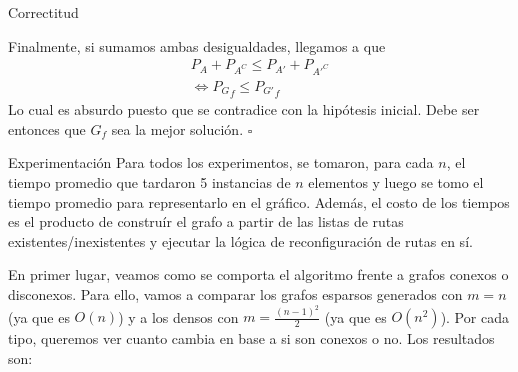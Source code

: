 \documentclass[a4paper]{article}
\begin{document}
\begin{subsection}{Correctitud}
\begin{itemize}
\begin{enumerate}[(a)]
    \end{enumerate}
\end{itemize}
Finalmente, si sumamos ambas desigualdades, llegamos a que 
\begin{align*}
	P_A + P_{A^C} \leq P_{A'} + P_{{A'}^C} \\ 
    \Leftrightarrow {P_G}_f \leq {P_{G'}}_f
\end{align*}
Lo cual es absurdo puesto que se contradice con la hip\'{o}tesis inicial. Debe ser entonces que $G_f$ sea la mejor soluci\'{o}n. $\square$

\end{subsection}

\begin{subsection}{Experimentaci\'{o}n}
Para todos los experimentos, se tomaron, para cada $n$, el tiempo promedio que tardaron 5 instancias de $n$ elementos y luego se tomo el tiempo promedio para representarlo en el gr\'{a}fico. Adem\'{a}s, el costo de los tiempos es el producto de constru\'{i}r el grafo a partir de las listas de rutas existentes/inexistentes y ejecutar la l\'{o}gica de reconfiguraci\'{o}n de rutas en s\'{i}.


En primer lugar, veamos como se comporta el algoritmo frente a grafos conexos o disconexos. Para ello, vamos a comparar los grafos 
esparsos generados con $m=n$ (ya que es $O(n)$) y a los densos con $m= \frac{(n-1)^2}{2}$ (ya que es $O(n^2)$). Por cada tipo, queremos ver cuanto cambia en base a si son conexos o no. Los resultados son:\\



\end{subsection}
\end{document}
